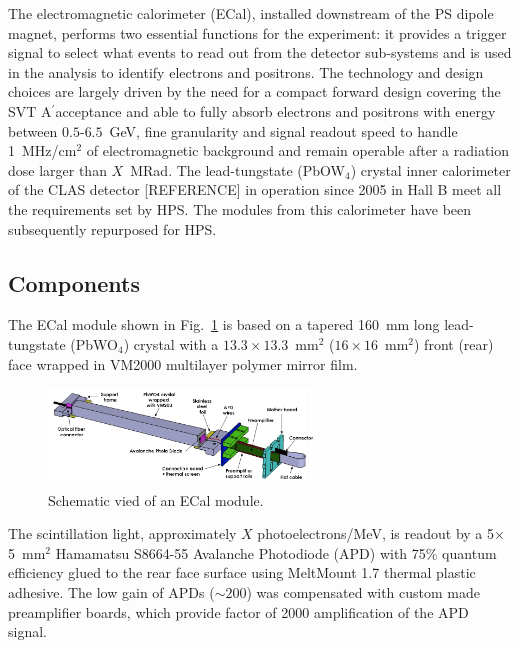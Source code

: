 \documentclass[final,3p,times,twocolumn]{elsarticle}
\newcommand{\Aprime}{A\ensuremath{^\prime}}
\begin{document}
The electromagnetic calorimeter (ECal), installed downstream of the PS dipole magnet, performs two 
essential 
functions for the experiment: it provides a trigger signal to select what events to read out from the 
detector sub-systems and is used in the analysis to identify electrons and positrons. 
The technology and design choices are largely driven by the need for a compact forward design 
covering the SVT \Aprime acceptance and able to fully absorb 
electrons and positrons with energy between $0.5$-$6.5$~GeV, fine granularity and signal 
readout speed to handle 1~MHz/cm$^{2}$ of electromagnetic background and remain operable 
after a radiation dose larger than $X$~MRad. The lead-tungstate (PbOW$_{4}$) crystal inner 
calorimeter of the CLAS detector [REFERENCE] in operation since 2005 in Hall B meet all the 
requirements set by HPS. The modules from this calorimeter have been subsequently repurposed for 
HPS. 


\subsection{Components}

The ECal module shown in Fig.~\ref{fig:ecal-module} is based on a tapered 160~mm long 
lead-tungstate (PbWO$_{4}$) crystal with a $13.3\times13.3$~mm$^2$ ($16\times16$~mm$^2$) front 
(rear) face wrapped in VM2000 multilayer polymer mirror film. 
\begin{figure}[]
\begin{center}
{\small
\includegraphics[width=7cm]{figures/ecal-module-schematic.png}
\caption{Schematic vied of an ECal module.}
\label{fig:ecal-module}
}
\end{center}
\end{figure}
The scintillation light, approximately $X$ photoelectrons/MeV, is readout by a 
5$\times$5~mm$^2$ Hamamatsu S8664-55 Avalanche Photodiode (APD) with 75\% quantum 
efficiency glued to the rear face surface using MeltMount 1.7 thermal plastic adhesive. 
The low gain of APDs ($\sim 200$) was compensated with custom made preamplifier boards, which 
provide factor of 2000 amplification of the APD signal.
\end{document}
